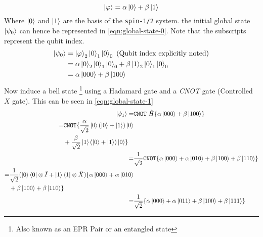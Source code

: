 \documentclass[reprint, amsmath,amssymb, aps]{revtex4-2}
\begin{document}
            \begin{equation} \label{eqn:general-initial-state}
                \ket{\varphi} = \alpha\ket{0} + \beta\ket{1}
            \end{equation}
            Where $\ket{0}$ and $\ket{1}$ are the basis of the \texttt{spin-1/2} system. the initial global state $\ket{\psi_0}$ can hence be represented in \eqref{eqn:global-state-0}. Note that the subscripts represent the qubit index. 
            \begin{align}
                \ket{\psi_0} &= \ket{\varphi}_2\ket{0}_1\ket{0}_0 \ \text{(Qubit index explicitly noted)} \\
                &= \alpha\ket{0}_{2}\ket{0}_{1}\ket{0}_{0} + \beta\ket{1}_{2}\ket{0}_{1}\ket{0}_{0} \\
                &= \alpha\ket{000} + \beta\ket{100} \label{eqn:global-state-0}
            \end{align}
            Now induce a bell state \footnote{Also known as an EPR Pair or an entangled state} using a Hadamard gate and a \textit{CNOT} gate (Controlled $X$ gate). This can be seen in \eqref{eqn:global-state-1}
            \begin{align}
                \ket{\psi_1} =& \texttt{CNOT}\ \hat{H}\{\alpha\ket{000} + \beta\ket{100}\} \\
                \begin{split}
                =& \texttt{CNOT}\{\frac{\alpha}{\sqrt{2}}\ket{0}(\ket{0}+\ket{1})\ket{0} \\ &+\frac{\beta}{\sqrt{2}}\ket{1}(\ket{0}+\ket{1})\ket{0}\} 
                \end{split}\\
                =& \frac{1}{\sqrt{2}}\texttt{CNOT}\{\alpha\ket{000} + \alpha\ket{010} + \beta\ket{100} + \beta\ket{110}\} \\
                \begin{split}
                =& \frac{1}{\sqrt{2}}(\ket{0}\bra{0}\otimes\hat{I}+\ket{1}\bra{1}\otimes\hat{X})\{\alpha\ket{000} + \alpha\ket{010} \\
                &+ \beta\ket{100} + \beta\ket{110}\} \label{eqn:global-state-1-intermediate} \\
                \end{split}\\
                =& \frac{1}{\sqrt{2}}\{\alpha\ket{000} + \alpha\ket{011} + \beta\ket{100} + \beta\ket{111}\} \label{eqn:global-state-1}
            \end{align}
\end{document}
